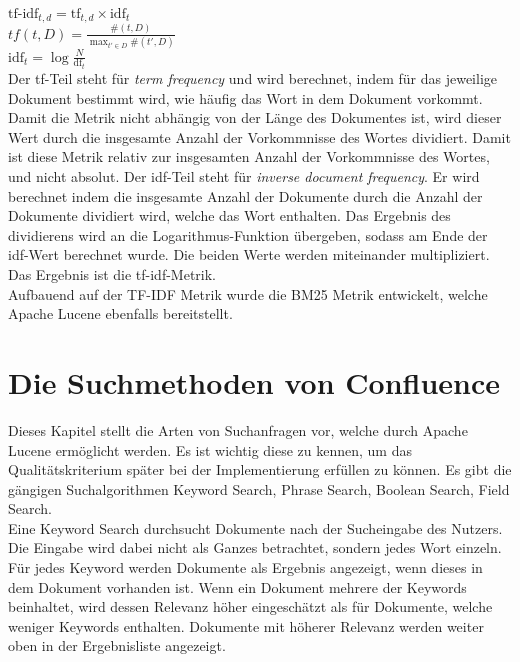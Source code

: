 \(\text{tf-idf}_{t,d}=\text{tf}_{t,d} \times \text{idf}_t\)\\

\(tf(t,D)=\frac {\#(t,D)}{\max _{t'\in D}\#(t',D)}\)\\

\(\text{idf}_t=\log {\frac {N}{\text{df}_t}}\)\\

Der tf-Teil steht für \textit{term frequency} und wird berechnet, indem für das jeweilige Dokument bestimmt wird, wie häufig das Wort in dem Dokument vorkommt.
Damit die Metrik nicht abhängig von der Länge des Dokumentes ist, wird dieser Wert durch die insgesamte Anzahl der Vorkommnisse des Wortes dividiert.
Damit ist diese Metrik relativ zur insgesamten Anzahl der Vorkommnisse des Wortes, und nicht absolut.
Der idf-Teil steht für \textit{inverse document frequency}.
Er wird berechnet indem die insgesamte Anzahl der Dokumente durch die Anzahl der Dokumente dividiert wird, welche das Wort enthalten.
Das Ergebnis des dividierens wird an die Logarithmus-Funktion übergeben, sodass am Ende der idf-Wert berechnet wurde.
Die beiden Werte werden miteinander multipliziert.
Das Ergebnis ist die tf-idf-Metrik.\\

Aufbauend auf der TF-IDF Metrik wurde die BM25 Metrik entwickelt, welche Apache Lucene ebenfalls bereitstellt.


\section{Die Suchmethoden von Confluence}
\label{chap:suchmethoden-von-confluence}
Dieses Kapitel stellt die Arten von Suchanfragen vor, welche durch Apache Lucene ermöglicht werden.
Es ist wichtig diese zu kennen, um das Qualitätskriterium später bei der Implementierung erfüllen zu können.
Es gibt die gängigen Suchalgorithmen Keyword Search, Phrase Search, Boolean Search, Field Search.\\

Eine Keyword Search durchsucht Dokumente nach der Sucheingabe des Nutzers.
Die Eingabe wird dabei nicht als Ganzes betrachtet, sondern jedes Wort einzeln.
Für jedes Keyword werden Dokumente als Ergebnis angezeigt, wenn dieses in dem Dokument vorhanden ist.
Wenn ein Dokument mehrere der Keywords beinhaltet, wird dessen Relevanz höher eingeschätzt als für Dokumente, welche weniger Keywords enthalten.
Dokumente mit höherer Relevanz werden weiter oben in der Ergebnisliste angezeigt.\\

